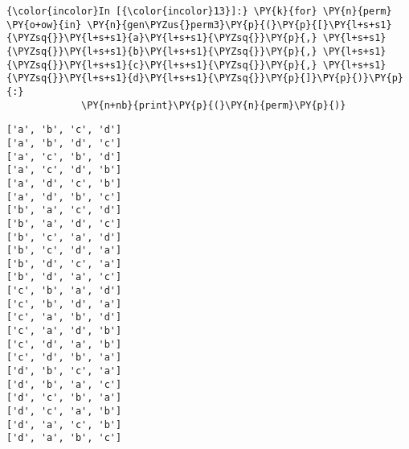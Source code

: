     \begin{Verbatim}[commandchars=\\\{\},frame=single,framerule=0.3mm,rulecolor=\color{cellframecolor}]
{\color{incolor}In [{\color{incolor}13}]:} \PY{k}{for} \PY{n}{perm} \PY{o+ow}{in} \PY{n}{gen\PYZus{}perm3}\PY{p}{(}\PY{p}{[}\PY{l+s+s1}{\PYZsq{}}\PY{l+s+s1}{a}\PY{l+s+s1}{\PYZsq{}}\PY{p}{,} \PY{l+s+s1}{\PYZsq{}}\PY{l+s+s1}{b}\PY{l+s+s1}{\PYZsq{}}\PY{p}{,} \PY{l+s+s1}{\PYZsq{}}\PY{l+s+s1}{c}\PY{l+s+s1}{\PYZsq{}}\PY{p}{,} \PY{l+s+s1}{\PYZsq{}}\PY{l+s+s1}{d}\PY{l+s+s1}{\PYZsq{}}\PY{p}{]}\PY{p}{)}\PY{p}{:}
             \PY{n+nb}{print}\PY{p}{(}\PY{n}{perm}\PY{p}{)}
\end{Verbatim}


    \begin{Verbatim}[commandchars=\\\{\},frame=single,framerule=0.3mm,rulecolor=\color{cellframecolor}]
['a', 'b', 'c', 'd']
['a', 'b', 'd', 'c']
['a', 'c', 'b', 'd']
['a', 'c', 'd', 'b']
['a', 'd', 'c', 'b']
['a', 'd', 'b', 'c']
['b', 'a', 'c', 'd']
['b', 'a', 'd', 'c']
['b', 'c', 'a', 'd']
['b', 'c', 'd', 'a']
['b', 'd', 'c', 'a']
['b', 'd', 'a', 'c']
['c', 'b', 'a', 'd']
['c', 'b', 'd', 'a']
['c', 'a', 'b', 'd']
['c', 'a', 'd', 'b']
['c', 'd', 'a', 'b']
['c', 'd', 'b', 'a']
['d', 'b', 'c', 'a']
['d', 'b', 'a', 'c']
['d', 'c', 'b', 'a']
['d', 'c', 'a', 'b']
['d', 'a', 'c', 'b']
['d', 'a', 'b', 'c']
\end{Verbatim}


    
    
    
